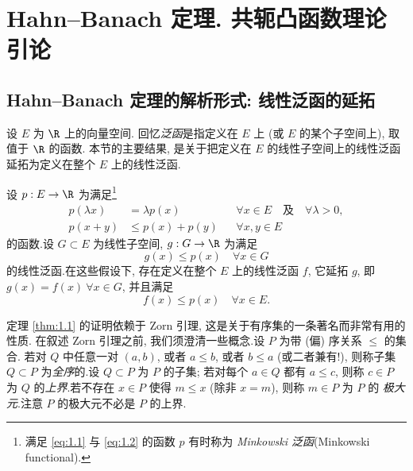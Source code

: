 
\chapter{Hahn--Banach 定理. 共轭凸函数理论引论}
\label{chap:1}

\section{Hahn--Banach 定理的解析形式: 线性泛函的延拓}
\label{sec:1.1}

设 $E$ 为 $\R$ 上的向量空间. 回忆\emph{泛函}是指定义在 $E$ 上 (或 $E$ 的某个子空间上),
取值于 $\R$ 的函数. 本节的主要结果, 是关于把定义在 $E$ 的线性子空间上的线性泛函
延拓为定义在整个 $E$ 上的线性泛函.

\begin{theorem}
\label{thm:1.1}
设 $p:E\to\R$ 为满足\footnote{满足 \eqref{eq:1.1} 与 \eqref{eq:1.2} 的函数 $p$ 有时称为
\emph{
Minkowski 泛函}(Minkowski functional).}
\begin{align}
p(\lambda x) &= \lambda p(x) && \forall x\in E \quad\text{及}\quad \forall\lambda>0,
  \label{eq:1.1}\\
p(x+y) &\le p(x)+p(y) && \forall x,y\in E
  \label{eq:1.2}
\end{align}
的函数.设 $G\subset E$ 为线性子空间, $g:G\to\R$ 为满足
\begin{equation}
g(x)\le p(x)\quad \forall x\in G
  \label{eq:1.3}
\end{equation}
的线性泛函.在这些假设下, 存在定义在整个 $E$ 上的线性泛函 $f$, 它延拓 $g$, 即
$g(x)=f(x)\ \forall x\in G$, 并且满足
\begin{equation}
f(x)\le p(x)\quad \forall x\in E.
  \label{eq:1.4}
\end{equation}
\end{theorem}

定理  \ref{thm:1.1} 的证明依赖于 
Zorn 引理, 这是关于有序集的一条著名而非常有用的性质.
在叙述 Zorn 引理之前, 我们须澄清一些概念.设 $P$ 为带 (偏) 序关系 $\le$ 的集合.
若对 $Q$ 中任意一对 $(a,b)$, 或者 $a\le b$, 或者 $b\le a$ (或二者兼有!), 则称子集 $Q\subset P$
为\emph{全序}的.设 $Q\subset P$ 为 $P$ 的子集; 若对每个 $a\in Q$ 都有 $a\le c$, 则称 $c\in P$
为 $Q$ 的\emph{上界}.若不存在 $x\in P$ 使得 $m\le x$ (除非 $x=m$), 则称 $m\in P$ 为 $P$ 的
\emph{极大元}.注意 $P$ 的极大元不必是 $P$ 的上界.

